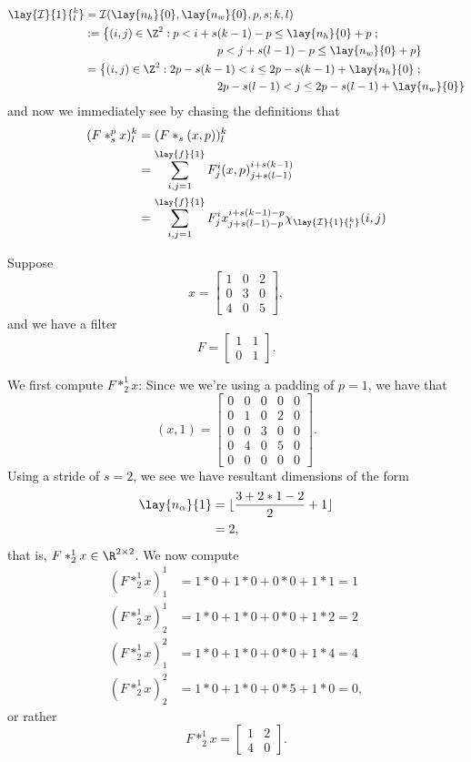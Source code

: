 \begin{align*}
	\lay{\mathcal{I}}{1}{^k_l}&=\mathcal{I}(\lay{n_h}{0},\lay{n_w}{0},p,s;k,l)\\
	&:=\left\{(i,j)\in\Z^2:p<i+s(k-1)-p\leq \lay{n_h}{0}+p\right.; \\
	&\hspace{4cm} \left.p<j+s(l-1)-p\leq \lay{n_w}{0}+p\right\}\\
	&=\left\{(i,j)\in\Z^2:2p-s(k-1)<i\leq 2p-s(k-1)+\lay{n_h}{0}\right.;\\
	&\hspace{4cm}\left.2p-s(l-1)<j\leq 2p-s(l-1)+\lay{n_w}{0}\right\}
\end{align*}
and now we immediately see by chasing the definitions that
\begin{align*}
	(F*_s^px)^k_l&=(F*_s(x,p))^k_l\\
	&=\sum_{i,j=1}^{\lay{f}{1}}F^i_j(x,p)^{i+s(k-1)}_{j+s(l-1)}\\
	&=\sum_{i,j=1}^{\lay{f}{1}}F^i_jx^{i+s(k-1)-p}_{j+s(l-1)-p}\chi_{\lay{\mathcal{I}}{1}{^k_l}}(i,j)
\end{align*}

\begin{ex}
	Suppose
	$$x=\begin{bmatrix}
		1&0&2\\
		0&3&0\\
		4&0&5
	\end{bmatrix},$$
	and we have a filter
	$$F=\begin{bmatrix}
		1&1\\
		0&1
	\end{bmatrix}.$$
	
	We first compute $F*_2^1x$:  Since we we're using a padding of $p=1$, we have that
	$$(x,1)=\begin{bmatrix}
		0&0&0&0&0\\
		0&1&0&2&0\\
		0&0&3&0&0\\
		0&4&0&5&0\\
		0&0&0&0&0
	\end{bmatrix}.$$
	Using a stride of $s=2$, we see we have resultant dimensions of the form
	\begin{align*}
		\lay{n_\alpha}{1}&=\lfloor\frac{3+2*1-2}{2}+1\rfloor\\
		&=2,
	\end{align*}
	that is, $F*_2^1x\in\R^{2\times 2}$.  We now compute
	\begin{align*}
		(F*_2^1x)^1_1&=1*0+1*0+0*0+1*1=1\\
		(F*_2^1x)^1_2&=1*0+1*0+0*0+1*2=2\\
		(F*_2^1x)^2_1&=1*0+1*0+0*0+1*4=4\\
		(F*_2^1x)^2_2&=1*0+1*0+0*5+1*0=0,
	\end{align*}
	or rather
	$$F*_2^1x=\begin{bmatrix}
		1&2\\
		4&0
	\end{bmatrix}.$$
\end{ex}




